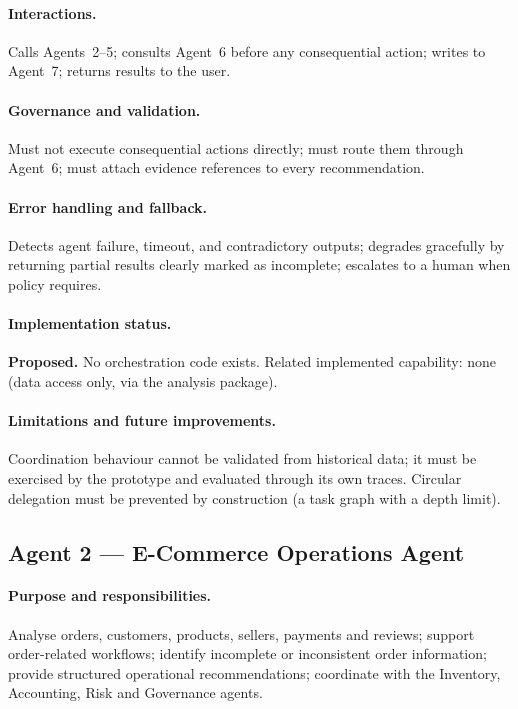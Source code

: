 \documentclass[11pt,a4paper]{article}
\begin{document}
\paragraph{Interactions.} Calls Agents~2--5; consults Agent~6 before any consequential action; writes to Agent~7; returns results to the user.

\paragraph{Governance and validation.} Must not execute consequential actions directly; must route them through Agent~6; must attach evidence references to every recommendation.

\paragraph{Error handling and fallback.} Detects agent failure, timeout, and contradictory outputs; degrades gracefully by returning partial results clearly marked as incomplete; escalates to a human when policy requires.

\paragraph{Implementation status.} \textbf{Proposed.} No orchestration code exists. Related implemented capability: none (data access only, via the analysis package).

\paragraph{Limitations and future improvements.} Coordination behaviour cannot be validated from historical data; it must be exercised by the prototype and evaluated through its own traces. Circular delegation must be prevented by construction (a task graph with a depth limit).

\subsection{Agent 2 --- E-Commerce Operations Agent}
\paragraph{Purpose and responsibilities.} Analyse orders, customers, products, sellers, payments and reviews; support order-related workflows; identify incomplete or inconsistent order information; provide structured operational recommendations; coordinate with the Inventory, Accounting, Risk and Governance agents.
\end{document}
